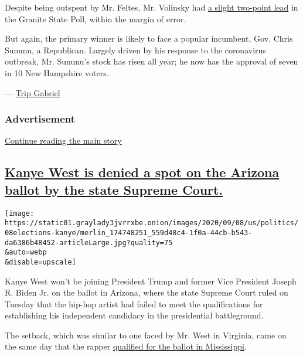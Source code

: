 Despite being outspent by Mr. Feltes, Mr. Volinsky had
\href{https://scholars.unh.edu/survey_center_polls/605/}{a slight
two-point lead} in the Granite State Poll, within the margin of error.

But again, the primary winner is likely to face a popular incumbent,
Gov. Chris Sununu, a Republican. Largely driven by his response to the
coronavirus outbreak, Mr. Sununu's stock has risen all year; he now has
the approval of seven in 10 New Hampshire voters.

--- \href{https://www.nytimes3xbfgragh.onion/by/trip-gabriel}{Trip
Gabriel}

\hypertarget{advertisement-3}{%
\subsubsection{Advertisement}\label{advertisement-3}}

\protect\hyperlink{after-dfp-ad-mid4}{Continue reading the main story}

\hypertarget{kanye-west-is-denied-a-spot-on-the-arizona-ballot-by-the-state-supreme-court}{%
\subsection{\texorpdfstring{\protect\hyperlink{kanye-west-is-denied-a-spot-on-the-arizona-ballot-by-the-state-supreme-court}{Kanye
West is denied a spot on the Arizona ballot by the state Supreme
Court.}}{Kanye West is denied a spot on the Arizona ballot by the state Supreme Court.}}\label{kanye-west-is-denied-a-spot-on-the-arizona-ballot-by-the-state-supreme-court}}

\texttt{[image: https://static01.graylady3jvrrxbe.onion/images/2020/09/08/us/politics/08elections-kanye/merlin\_174748251\_559d48c4-1f0a-44cb-b543-da6386b48452-articleLarge.jpg?quality=75\\\&auto=webp\\\&disable=upscale]}

Kanye West won't be joining President Trump and former Vice President
Joseph R. Biden Jr. on the ballot in Arizona, where the state Supreme
Court ruled on Tuesday that the hip-hop artist had failed to meet the
qualifications for establishing his independent candidacy in the
presidential battleground.

The setback, which was similar to one faced by Mr. West in Virginia,
came on the same day that the rapper
\href{https://www.sos.ms.gov/content/documents/elections/2020\%20Candidate\%20Qualifying\%20List.pdf}{qualified
for the ballot in Mississippi}.

